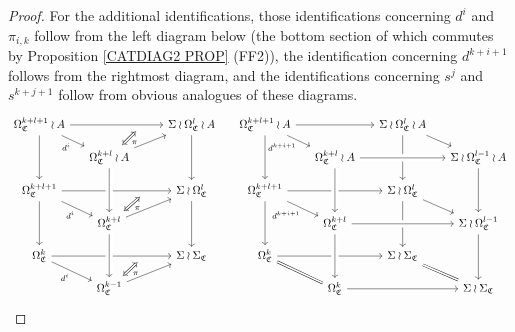 \documentclass[a4paper,10pt
,draft
]{article}%
\numberwithin{equation}{section}
\numberwithin{figure}{section}
\theoremstyle{definition} %
\newcommand{\1}{\ensuremath{\mathbbm 1}}%
\begin{document}
\begin{proof}
For the additional identifications, 
those identifications concerning $d^i$ and $\pi_{i,k}$
follow from the left diagram below 
(the bottom section of which commutes by 
Proposition \ref{CATDIAG2 PROP} (FF2)),
the identification concerning $d^{k+i+1}$ follows from the rightmost diagram, and the identifications concerning 
$s^j$ and $s^{k+j+1}$
follow from obvious analogues of these diagrams.
\[
\begin{tikzcd}[row sep = 10pt,column sep = 13pt]
	\Omega^{k+l+1}_{\mathfrak{C}} \wr A \ar{rrr}[near end, name=TT,swap]{} \ar{rd}[swap]{d^i} \ar{dd} &&&
	\Sigma \wr \Omega^{l}_{\mathfrak{C}} \wr A \ar{dd}
&
	\Omega^{k+l+1}_{\mathfrak{C}} \wr A \ar{rr} \ar{rd}[swap]{d^{k+i+1}} \ar{dd} &&
	\Sigma \wr \Omega^{l}_{\mathfrak{C}} \wr A \ar{rd} \ar{dd}
\\
	&
	|[alias=TD]|
	\Omega^{k+l}_{\mathfrak{C}} \wr A \ar{rru} &&
&
	&
	\Omega^{k+l}_{\mathfrak{C}} \wr A \arrow[rr, crossing over] &&
	\Sigma \wr \Omega^{l-1}_{\mathfrak{C}} \wr A 	 \ar{dd}
\\
	\Omega^{k+l+1}_{\mathfrak{C}} \ar{rrr}[near end, name=MT,swap]{} \ar{rd}[swap]{d^i} \ar{dd} &&&
	\Sigma \wr \Omega^{l}_{\mathfrak{C}} \ar{dd}
&
	\Omega^{k+l+1}_{\mathfrak{C}} \ar{rr} \ar{rd}[swap]{d^{k+i+1}} \ar{dd}&&
	\Sigma \wr \Omega^{l}_{\mathfrak{C}} \ar{rd} \ar{dd}
\\
	&
	|[alias=MD]|
	\Omega^{k+l}_{\mathfrak{C}} \ar{rru} \arrow[uu, leftarrow, crossing over] &&
&
	&
	\Omega^{k+l}_{\mathfrak{C}} \arrow[rr, crossing over] \arrow[uu, leftarrow, crossing over] &&
	\Sigma \wr \Omega^{l-1}_{\mathfrak{C}} \ar{dd}
\\
	\Omega^{k}_{\mathfrak{C}} \ar{rrr}[near end, name=DT,swap]{} \ar{rd}[swap]{d^i} &&&
	\Sigma \wr \Sigma_{\mathfrak{C}}
&
	\Omega^{k}_{\mathfrak{C}} \ar{rr} \ar[equal]{rd} &&
	\Sigma \wr \Sigma_{\mathfrak{C}} \ar[equal]{rd}
\\
	&
	|[alias=DD]|
	\Omega^{k-1}_{\mathfrak{C}} \ar{rru} \arrow[uu, leftarrow, crossing over] &&
&
	&
	\Omega^{k}_{\mathfrak{C}} \ar{rr} \arrow[uu, leftarrow, crossing over] &&
	\Sigma \wr \Sigma_{\mathfrak{C}} 
\arrow[Leftrightarrow, from=TT, to=TD,shorten >=0.05cm,shorten <=0.05cm,
"\pi"
]
\arrow[Leftrightarrow, from=MT, to=MD,shorten >=0.05cm,shorten <=0.05cm,
"\pi"
]
\arrow[Leftrightarrow, from=DT, to=DD,shorten >=0.05cm,shorten <=0.05cm,
"\pi"
]
\end{tikzcd}
\]
\end{proof}
\end{document}
